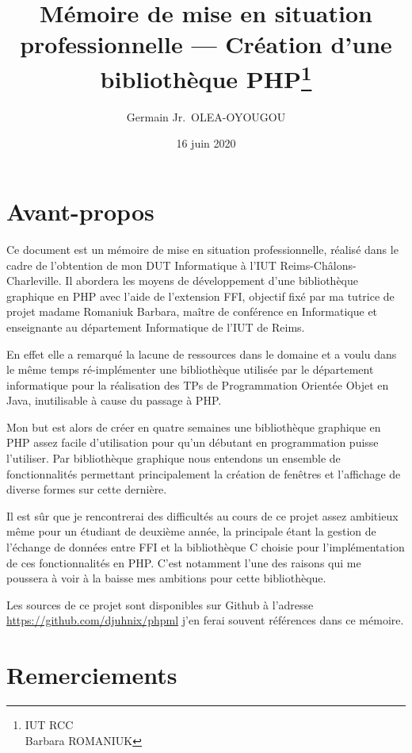 \documentclass[11pt,a4paper,krantz2,11pt,oneside]{krantz}
\title{Mémoire de mise en situation professionnelle --- Création d'une bibliothèque PHP\thanks{IUT RCC\\
Barbara ROMANIUK}}
\author{Germain Jr.~OLEA-OYOUGOU}
\date{16 juin 2020}
\begin{document}
\maketitle

{
\hypersetup{linkcolor=}
\setcounter{tocdepth}{1}
\tableofcontents
}
\listoftables
\listoffigures
\hypertarget{avant-propos}{%
\chapter*{Avant-propos}\label{avant-propos}}


Ce document est un mémoire de mise en situation professionnelle, réalisé dans le cadre de l'obtention de mon DUT Informatique à l'IUT Reims-Châlons-Charleville. Il abordera les moyens de développement d'une bibliothèque graphique en PHP avec l'aide de l'extension FFI, objectif fixé par ma tutrice de projet madame Romaniuk Barbara, maître de conférence en Informatique et enseignante au département Informatique de l'IUT de Reims.

En effet elle a remarqué la lacune de ressources dans le domaine et a voulu dans le même temps ré-implémenter une bibliothèque utilisée par le département informatique pour la réalisation des TPs de Programmation Orientée Objet en Java, inutilisable à cause du passage à PHP.

Mon but est alors de créer en quatre semaines une bibliothèque graphique en PHP assez facile d'utilisation pour qu'un débutant en programmation puisse l'utiliser. Par bibliothèque graphique nous entendons un ensemble de fonctionnalités permettant principalement la création de fenêtres et l'affichage de diverse formes sur cette dernière.

Il est sûr que je rencontrerai des difficultés au cours de ce projet assez ambitieux même pour un étudiant de deuxième année, la principale étant la gestion de l'échange de données entre FFI et la bibliothèque C choisie pour l'implémentation de ces fonctionnalités en PHP. C'est notamment l'une des raisons qui me poussera à voir à la baisse mes ambitions pour cette bibliothèque.

Les sources de ce projet sont disponibles sur Github à l'adresse \url{https://github.com/djuhnix/phpml} j'en ferai souvent références dans ce mémoire.

\mainmatter

\hypertarget{remerciements}{%
\chapter*{Remerciements}\label{remerciements}}
\end{document}
